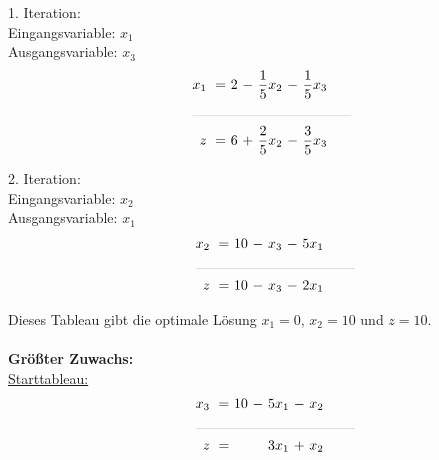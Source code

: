 \documentclass [a4paper,11pt]{article}
\begin{document}
\begin{enumerate}
\begin{enumerate}
\begin{enumerate}
                        1. Iteration:\\
                        Eingangsvariable: $x_1$\\
                        Ausgangsvariable: $x_3$
                        \begin{align*}
                        \begin{alignedat}{6}
                        && x_1 &\ = &\  2 &\ - &\ \frac{1}{5}x_2 &\ - &\ \frac{1}{5}x_3 \\
                        &\rlap{\rule{4cm}{.1pt}} &&&&&&&\\
                        && z   &\ = &\  6 &\ + &\ \frac{2}{5}x_2 &\ - &\ \frac{3}{5}x_3
                        \end{alignedat}
                        \end{align*}

                        2. Iteration:\\
                        Eingangsvariable: $x_2$\\
                        Ausgangsvariable: $x_1$
                        \begin{align*}
                        \begin{alignedat}{6}
                        && x_2 &\ = &\ 10 &\ - &\ x_3 &\ - &\ 5x_1 \\
                        &\rlap{\rule{4cm}{.1pt}} &&&&&&&\\
                        && z   &\ = &\ 10 &\ - &\ x_3 &\ - &\ 2x_1
                        \end{alignedat}
                        \end{align*}

                        Dieses Tableau gibt die optimale Lösung $x_1 = 0$, $x_2 = 10$ und $z = 10$.\\ \\

                        \textbf{Größter Zuwachs:}\\
                        \underline{Starttableau:}
                        \begin{align*}
                        \begin{alignedat}{6}
                        && x_3 &\ = &\ 10 &\ - &\ 5x_1 &\ - &\  x_2 \\
                        &\rlap{\rule{4cm}{.1pt}} &&&&&&&\\
                        && z   &\ = &\    &    &\ 3x_1 &\ + &\  x_2
                        \end{alignedat}
                        \end{align*}


\end{enumerate}
\end{enumerate}
\end{enumerate}
\end{document}
